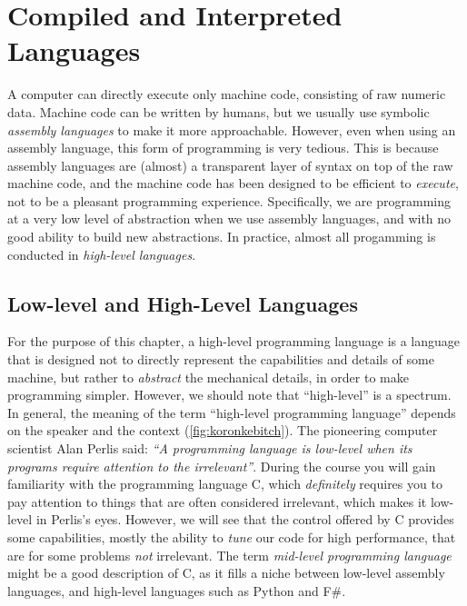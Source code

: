 \chapter{Compiled and Interpreted Languages}
\label{chap:compiled-interpreted}

A computer can directly execute only machine code, consisting of raw
numeric data.  Machine code can be written by humans, but we usually
use symbolic \textit{assembly languages} to make it more approachable.
However, even when using an assembly language, this form of
programming is very tedious.  This is because assembly languages are
(almost) a transparent layer of syntax on top of the raw machine code,
and the machine code has been designed to be efficient to
\textit{execute}, not to be a pleasant programming experience.
Specifically, we are programming at a very low level of abstraction
when we use assembly languages, and with no good ability to build new
abstractions.  In practice, almost all progamming is conducted in
\textit{high-level languages}.

\section{Low-level and High-Level Languages}

For the purpose of this chapter, a high-level programming language is
a language that is designed not to directly represent the capabilities
and details of some machine, but rather to \textit{abstract} the
mechanical details, in order to make programming simpler.  However, we
should note that ``high-level'' is a spectrum.  In general, the
meaning of the term ``high-level programming language'' depends on the
speaker and the context (\cref{fig:koronkebitch}).  The pioneering
computer scientist Alan Perlis said: \textit{``A programming language
  is low-level when its programs require attention to the
  irrelevant''}.  During the course you will gain familiarity with the
programming language C, which \textit{definitely} requires you to pay
attention to things that are often considered irrelevant, which makes
it low-level in Perlis's eyes.  However, we will see that the control
offered by C provides some capabilities, mostly the ability to
\textit{tune} our code for high performance, that are for some
problems \textit{not} irrelevant.  The term \textit{mid-level
  programming language} might be a good description of C, as it fills
a niche between low-level assembly languages, and high-level languages
such as Python and F\#.

